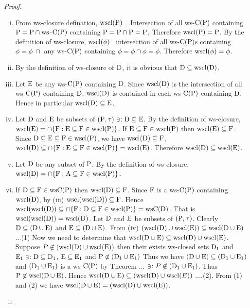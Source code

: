 \begin{proof}
\begin{enumerate}[(i)]
\item From ws-closure defination, $\mathrm{wscl}(\mathrm{P})$ =Intersection of all ws-$\mathrm{C}(\mathrm{P})$ containing $\mathrm{P} =\mathrm{P} \cap \mathrm{ws}$-$\mathrm{C}(\mathrm{P})$ containing $\mathrm{P}=\mathrm{P}\cap \mathrm{P} =\mathrm{P}$, Therefore $\mathrm{wscl}(\mathrm{P})=\mathrm{P}$. By the definition of ws-closure, $\mathrm{wscl}(\phi)$=intersection of all ws-$\mathrm{C}(\mathrm{P})$s containing $\phi =\phi \ \cap$  any ws-$\mathrm{C}(\mathrm{P})$ containing $\phi= \phi\cap \phi=\phi$. Therefore $\mathrm{wscl}(\phi)=\phi$.

\item By the definition of ws-closure of $\mathrm{D}$, it is obvious that $\mathrm{D}\subseteq  \mathrm{wscl}(\mathrm{D})$.

\item Let $\mathrm{E}$ be any ws-$\mathrm{C}(\mathrm{P})$ containing $\mathrm{D}$. Since $\mathrm{wscl}(\mathrm{D})$ is the intersection of all ws-$\mathrm{C}(\mathrm{P})$ containing $\mathrm{D}$. $\mathrm{wscl}(\mathrm{D})$ is contained in each ws-$\mathrm{C}(\mathrm{P})$ containing $\mathrm{D}$. Hence in particular $\mathrm{wscl}(\mathrm{D})\subseteq \mathrm{E}$.

\item Let $\mathrm{D}$ and $\mathrm{E}$  be subsets of $(\mathrm{P},\tau) \ni: \mathrm{D}\subseteq \mathrm{E}$. By the definition of ws-closure, $\mathrm{wscl}(\mathrm{E})=\cap \{\mathrm{F}: \mathrm{E}\subseteq \mathrm{F}\in \mathrm{wscl}(\mathrm{P})\}$. If $\mathrm{E}\subseteq \mathrm{F}\in \mathrm{wscl}(\mathrm{P})$ then $\mathrm{wscl}(\mathrm{E})\subseteq \mathrm{F}$. Since $\mathrm{D}\subseteq \mathrm{E} \subseteq \mathrm{F}\in \mathrm{wscl}(\mathrm{P})$, we have $\mathrm{wscl}(\mathrm{D})\subseteq \mathrm{F}$, $\mathrm{wscl}(\mathrm{D})\subseteq \cap \{\mathrm{F}: \mathrm{E}\subseteq \mathrm{F}\in \mathrm{wscl}(\mathrm{P})\}=\mathrm{wscl}(\mathrm{E})$. Therefore $\mathrm{wscl}(\mathrm{D})\subseteq \mathrm{wscl}(\mathrm{E})$.

\item Let $\mathrm{D}$ be any subset of $\mathrm{P}$. By the definition of ws-closure, $\mathrm{wscl}(\mathrm{D})=\cap \{\mathrm{F}: \mathrm{A}\subseteq \mathrm{F} \in \mathrm{wscl}(\mathrm{P})\}$.

\item If $\mathrm{D}\subseteq \mathrm{F}\in \mathrm{ws}\mathrm{C}(\mathrm{P})$ then $\mathrm{wscl}(\mathrm{D})\subseteq \mathrm{F}$. Since $\mathrm{F}$ is a ws-$\mathrm{C}(\mathrm{P})$ containing $\mathrm{wscl}(\mathrm{D})$, by (iii) $\mathrm{wscl}(\mathrm{wscl}(\mathrm{D}))\subseteq \mathrm{F}$. Hence $\mathrm{wscl}(\mathrm{wscl}(\mathrm{D}))\subseteq \cap \{\mathrm{F}: \mathrm{D}\subseteq \mathrm{F}\in \mathrm{wscl}(\mathrm{P})\}=\mathrm{ws} \mathrm{C}(\mathrm{D})$. That is $\mathrm{wscl}(\mathrm{wscl}(\mathrm{D}))=\mathrm{wscl}(\mathrm{D})$. Let $\mathrm{D}$ and $\mathrm{E}$  be subsets of $(\mathrm{P},\tau)$. Clearly $\mathrm{D}\subseteq (\mathrm{D}\cup \mathrm{E})$ and $\mathrm{E}\subseteq (\mathrm{D}\cup \mathrm{E})$. From (iv) $(\mathrm{wscl}(\mathrm{D})\cup \mathrm{wscl}(\mathrm{E}))\subseteq \mathrm{wscl}(\mathrm{D}\cup \mathrm{E})$ ...(1) Now we need to determine that $\mathrm{wscl}(\mathrm{D}\cup \mathrm{E})\subseteq \mathrm{wscl}(\mathrm{D})\cup \mathrm{wscl}(\mathrm{E})$. Suppose $P\not\in (\mathrm{wscl}(\mathrm{D})\cup \mathrm{wscl}(\mathrm{E}))$ then their exists ws-closed sets $\mathrm{D}_{1}$ and $\mathrm{E}_{1}\ni: \mathrm{D}\subseteq \mathrm{D}_{1}$, $\mathrm{E}\subseteq \mathrm{E}_{1}$ and $\mathrm{P}\not\in (\mathrm{D}_{1} \cup \mathrm{E}_{1})$ Thus we have $(\mathrm{D}\cup \mathrm{E})\subseteq (\mathrm{D}_{1} \cup \mathrm{E}_{1})$ and $(\mathrm{D}_{1} \cup \mathrm{E}_{1})$ is a ws-$\mathrm{C}(\mathrm{P})$ by Theorem ... $\ni: P\not\in (\mathrm{D}_{1} \cup \mathrm{E}_{1})$. Thus $\mathrm{P}\not\in \mathrm{wscl}(\mathrm{D}\cup \mathrm{E})$. Hence $\mathrm{wscl}(\mathrm{D}\cup \mathrm{E})\subseteq (\mathrm{wscl}(\mathrm{D})\cup \mathrm{wscl}(E))$ ....(2). From (1) and (2) we have $\mathrm{wscl}(\mathrm{D}\cup \mathrm{E})=(\mathrm{wscl}(\mathrm{D})\cup \mathrm{wscl}(\mathrm{E}))$.
\end{enumerate}
\end{proof}


